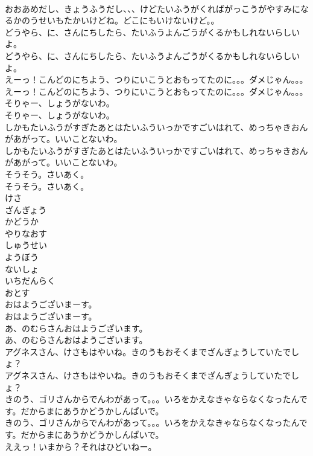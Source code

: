 \documentclass[8pt]{extreport}
\begin{document}
\begin{CJK}{UTF8}{min}
\\	おおあめだし、きょうふうだし、、、けどたいふうがくればがっこうがやすみになるかのうせいもたかいけどね。どこにもいけないけど。。 
\\	どうやら、に、さんにちしたら、たいふうよんごうがくるかもしれないらしいよ。	
\\	どうやら、に、さんにちしたら、たいふうよんごうがくるかもしれないらしいよ。 
\\	えーっ！こんどのにちよう、つりにいこうとおもってたのに。。。ダメじゃん。。。	
\\	えーっ！こんどのにちよう、つりにいこうとおもってたのに。。。ダメじゃん。。。 
\\	そりゃー、しょうがないわ。	
\\	そりゃー、しょうがないわ。 
\\	しかもたいふうがすぎたあとはたいふういっかですごいはれて、めっちゃきおんがあがって。いいことないわ。	
\\	しかもたいふうがすぎたあとはたいふういっかですごいはれて、めっちゃきおんがあがって。いいことないわ。 
\\	そうそう。さいあく。	
\\	そうそう。さいあく。 
\\	けさ
\\	ざんぎょう
\\	かどうか
\\	やりなおす
\\	しゅうせい
\\	ようぼう
\\	ないしょ
\\	いちだんらく
\\	おとす
\\	おはようございまーす。	
\\	おはようございまーす。 
\\	あ、のむらさんおはようございます。	
\\	あ、のむらさんおはようございます。 
\\	アグネスさん、けさもはやいね。きのうもおそくまでざんぎょうしていたでしょ？	
\\	アグネスさん、けさもはやいね。きのうもおそくまでざんぎょうしていたでしょ？ 
\\	きのう、ゴリさんからでんわがあって。。。いろをかえなきゃならなくなったんです。だからまにあうかどうかしんぱいで。	
\\	きのう、ゴリさんからでんわがあって。。。いろをかえなきゃならなくなったんです。だからまにあうかどうかしんぱいで。 
\\	ええっ！いまから？それはひどいねー。	

\end{CJK}
\end{document}
